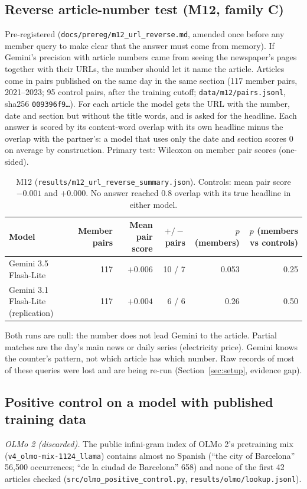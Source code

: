 \documentclass[10pt,a4paper]{article}
\begin{document}
\subsection{Reverse article-number test (M12, family C)}\label{sec:m12}
Pre-registered (\texttt{docs/prereg/m12\_url\_reverse.md}, amended once before any member query to make clear that the
answer must come from memory). If Gemini's precision with article numbers came from seeing the newspaper's pages
together with their URLs, the number should let it name the article. Articles come in pairs published on the same day
in the same section (117 member pairs, 2021--2023; 95 control pairs, after the training cutoff;
\texttt{data/m12/pairs.jsonl}, sha256 \texttt{009396f9\dots}). For each article the model gets the URL with the number,
date and section but without the title words, and is asked for the headline. Each answer is scored by its content-word
overlap with its own headline minus the overlap with the partner's: a model that uses only the date and section scores
0 on average by construction. Primary test: Wilcoxon on member pair scores (one-sided).

\begin{table}[h]\centering\small
\begin{tabular}{lrrrrr}
\toprule
Model & Member pairs & Mean pair score & $+/-$ pairs & $p$ (members) & $p$ (members vs controls)\\
\midrule
Gemini 3.5 Flash-Lite & 117 & $+0.006$ & 10 / 7 & 0.053 & 0.25\\
Gemini 3.1 Flash-Lite (replication) & 117 & $+0.004$ & 6 / 6 & 0.26 & 0.50\\
\bottomrule
\end{tabular}
\caption{M12 (\texttt{results/m12\_url\_reverse\_summary.json}). Controls: mean pair score $-0.001$ and $+0.000$. No
answer reached 0.8 overlap with its true headline in either model.}\label{tab:m12}
\end{table}
Both runs are null: the number does not lead Gemini to the article. Partial matches are the day's main news or daily
series (electricity price). Gemini knows the counter's pattern, not which article has which number. Raw records of most
of these queries were lost and are being re-run (Section~\ref{sec:setup}, evidence gap).

\subsection{Positive control on a model with published training data}\label{sec:posctrl}
\emph{OLMo 2 (discarded).} The public infini-gram index of OLMo 2's pretraining mix (\texttt{v4\_olmo-mix-1124\_llama})
contains almost no Spanish (``the city of Barcelona'' 56,500 occurrences; ``de la ciudad de Barcelona'' 658) and none
of the first 42 articles checked (\texttt{src/olmo\_positive\_control.py}, \texttt{results/olmo/lookup.jsonl}).
\end{document}
